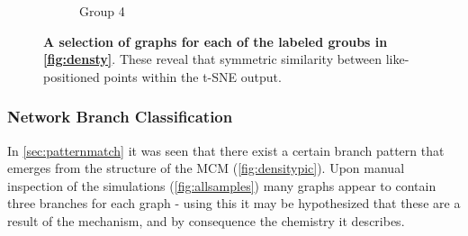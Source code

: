 \begin{figure}[H]
\begin{subfigure}[b]{.23\textwidth}
     \caption{Group 4}
     \end{subfigure}
        \caption{\textbf{A selection of graphs for each of the labeled groubs in \autoref{fig:densty}}. These reveal that symmetric similarity between like-positioned points within the t-SNE output.  }
      \label{fig:densitypic}
\end{figure}




\subsubsection{Network Branch Classification}\label{sec:netshape}
In \autoref{sec:patternmatch} it was seen that there exist a certain branch pattern that emerges from the structure of the MCM (\autoref{fig:densitypic}). Upon manual inspection of the simulations (\autoref{fig:allsamples}) many graphs appear to contain three branches for each graph - using this it may be hypothesized that these are a result of the mechanism, and by consequence the chemistry it describes.


